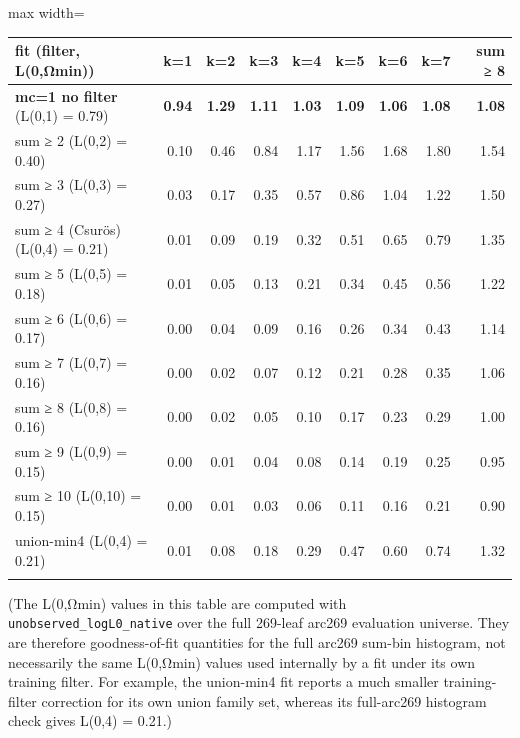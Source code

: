 \documentclass[
  10pt,
]{article}
\begin{document}
\begin{center}
\begin{adjustbox}{max width=\textwidth}
\begin{tabular}{@{}lrrrrrrrr@{}}
\toprule\noalign{}
fit (filter, L(0,Ωmin)) & k=1 & k=2 & k=3 & k=4 & k=5 & k=6 & k=7 & sum
≥ 8 \\
\midrule\noalign{}
\textbf{mc=1 no filter} (L(0,1) = 0.79) & \textbf{0.94} & \textbf{1.29}
& \textbf{1.11} & \textbf{1.03} & \textbf{1.09} & \textbf{1.06} &
\textbf{1.08} & \textbf{1.08} \\
sum ≥ 2 (L(0,2) = 0.40) & 0.10 & 0.46 & 0.84 & 1.17 & 1.56 & 1.68 & 1.80
& 1.54 \\
sum ≥ 3 (L(0,3) = 0.27) & 0.03 & 0.17 & 0.35 & 0.57 & 0.86 & 1.04 & 1.22
& 1.50 \\
sum ≥ 4 (Csurös) (L(0,4) = 0.21) & 0.01 & 0.09 & 0.19 & 0.32 & 0.51 &
0.65 & 0.79 & 1.35 \\
sum ≥ 5 (L(0,5) = 0.18) & 0.01 & 0.05 & 0.13 & 0.21 & 0.34 & 0.45 & 0.56
& 1.22 \\
sum ≥ 6 (L(0,6) = 0.17) & 0.00 & 0.04 & 0.09 & 0.16 & 0.26 & 0.34 & 0.43
& 1.14 \\
sum ≥ 7 (L(0,7) = 0.16) & 0.00 & 0.02 & 0.07 & 0.12 & 0.21 & 0.28 & 0.35
& 1.06 \\
sum ≥ 8 (L(0,8) = 0.16) & 0.00 & 0.02 & 0.05 & 0.10 & 0.17 & 0.23 & 0.29
& 1.00 \\
sum ≥ 9 (L(0,9) = 0.15) & 0.00 & 0.01 & 0.04 & 0.08 & 0.14 & 0.19 & 0.25
& 0.95 \\
sum ≥ 10 (L(0,10) = 0.15) & 0.00 & 0.01 & 0.03 & 0.06 & 0.11 & 0.16 &
0.21 & 0.90 \\
union-min4 (L(0,4) = 0.21) & 0.01 & 0.08 & 0.18 & 0.29 & 0.47 & 0.60 &
0.74 & 1.32 \\
\bottomrule\noalign{}
\end{tabular}
\end{adjustbox}
\end{center}

(The L(0,Ωmin) values in this table are computed with
\texttt{unobserved\_logL0\_native} over the full 269-leaf arc269
evaluation universe. They are therefore goodness-of-fit quantities for
the full arc269 sum-bin histogram, not necessarily the same L(0,Ωmin)
values used internally by a fit under its own training filter. For
example, the union-min4 fit reports a much smaller training-filter
correction for its own union family set, whereas its full-arc269
histogram check gives L(0,4) = 0.21.)
\end{document}
